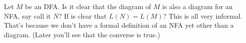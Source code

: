   Let $M$ be an DFA.
  Is it clear that the diagram of $M$ is also a diagram
  for an NFA, say call it $N$?
  If is clear that $L(N) = L(M)$?
  This is all very informal.
  That's because we don't have a formal definition of an NFA
  yet other than a diagram.
  (Later you'll see that the converse is true.)
